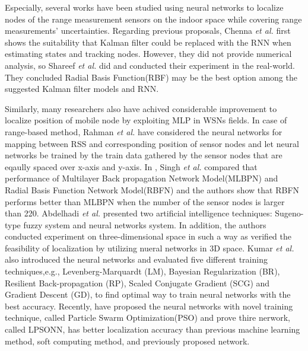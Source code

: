 \documentclass{ieeeaccess}
\begin{document}
Especially, several works have been studied using neural networks to localize nodes of the range measurement sensors on the indoor space while covering range measurements' uncertainties. Regarding previous proposals, Chenna \textit{et al.} first shows the suitability that Kalman filter could be replaced with the RNN when estimating states and tracking nodes\cite{chenna2004state}. However, they did not provide numerical analysis, so Shareef \textit{et al.} did and conducted their experiment in the real-world. They concluded Radial Basis Function(RBF) may be the best option among the suggested Kalman filter models and RNN\cite{shareef2008localization}. 

Similarly, many researchers also have achived considerable improvement to localize position of mobile node by exploiting MLP in WSNs fields\cite{shareef2008localization, rahman2009localization, singh2013tdoa,abdelhadi2013efficient,bernas2015fully, kumar2016localization, banihashemian2018new}. In case of range-based method, Rahman \textit{et al.} \cite{rahman2009localization} have considered the neural networks for mapping between RSS and corresponding position of sensor nodes and let neural networks be trained by the train data gathered by the sensor nodes that are eqaully spaced over x-axis and y-axis. In \cite{singh2013tdoa}, Singh \textit{et al.} compared that performance of Multilayer Back propagation Network Model(MLBPN) and Radial Basis Function Network Model(RBFN) and the authors show that RBFN performs better than MLBPN when the number of the sensor nodes is larger than 220. Abdelhadi \textit{et al.}  \cite{abdelhadi2013efficient} presented two artificial intelligence techniques: Sugeno-type fuzzy system and neural networks system. In addition, the authors conducted experiment on three-dimensional space in such a way as verified the feasibility of localization by utilizing nueral networks in 3D space. Kumar \textit{et al.} \cite{kumar2016localization} also introduced the neural networks and evaluated five different training techniques,e.g., Levenberg-Marquardt (LM), Bayesian Regularization
(BR), Resilient Back-propagation (RP), Scaled Conjugate Gradient (SCG) and Gradient
Descent (GD), to find optimal way to train neural networks with the best accuracy. Recently, \cite{banihashemian2018new} have proposed the neural networks with novel training technique, called Particle Swarm Optimization(PSO) and prove thire nerwork, called LPSONN, has better localization accuracy than previous machine learning method, soft computing method, and previously proposed network.
\end{document}
